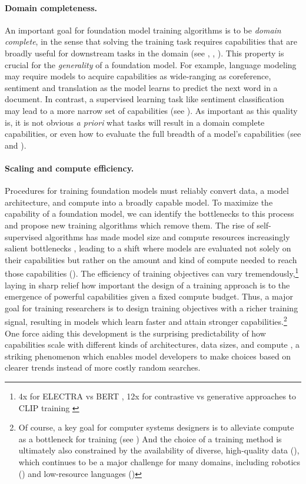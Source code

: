 \paragraph{Domain completeness.} An important goal for foundation model training algorithms is to be \textit{domain complete}, in the sense that solving the training task requires capabilities that are broadly useful for downstream tasks in the domain (see , , ). This property is crucial for the \textit{generality} of a foundation model. For example, language modeling may require models to acquire capabilities as wide-ranging as coreference, sentiment and translation as the model learns to predict the next word in a document. In contrast, a supervised learning task like sentiment classification may lead to a more narrow set of capabilities (see ). As important as this quality is, it is not obvious \textit{a priori} what tasks will result in a domain complete capabilities, or even how to evaluate the full breadth of a model's capabilities (see  and ). 

\paragraph{Scaling and compute efficiency.}
Procedures for training foundation models must reliably convert data, a model architecture, and compute into a broadly capable model. To maximize the capability of a foundation model, we can identify the bottlenecks to this process and propose new training algorithms which remove them. The rise of self-supervised algorithms has made model size and compute resources increasingly salient bottlenecks \citep{kaplan2020, henighan2020}, leading to a shift where models are evaluated not solely on their capabilities but rather on the amount and kind of compute needed to reach those capabilities (). The efficiency of training objectives can vary tremendously,\footnote{\eg 4x for ELECTRA \citep{Clark2020ELECTRAPT} vs BERT \citep{devlin2019bert}, 12x for contrastive vs generative approaches to CLIP training \citep{radford2021learning}} laying in sharp relief how important the design of a training approach is to the emergence of powerful capabilities given a fixed compute budget. Thus, a major goal for training researchers is to design training objectives with a richer training signal, resulting in models which learn faster and attain stronger capabilities.\footnote{Of course, a key goal for computer systems designers is to alleviate compute as a bottleneck for training (see ) And the choice of a training method is ultimately also constrained by the availability of diverse, high-quality data (), which continues to be a major challenge for many domains, including robotics () and low-resource languages ()} One force aiding this development is the surprising predictability of how capabilities scale with different kinds of architectures, data sizes, and compute \citep{Hestness2017DeepLS, kaplan2020},  a striking phenomenon which enables model developers to make choices based on clearer trends instead of more costly random searches.

